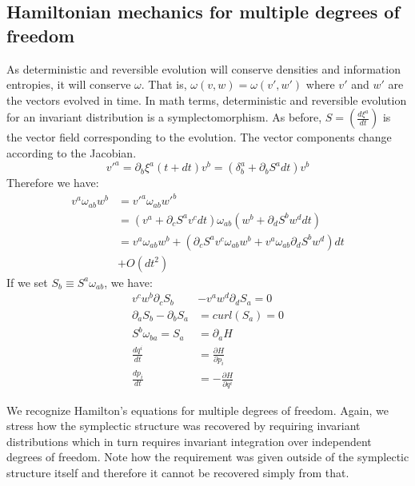 \documentclass[11pt]{elsarticle}
\begin{document}
\subsection*{Hamiltonian mechanics for multiple degrees of freedom}

As deterministic and reversible evolution will conserve densities and information entropies, it will conserve $\omega$. That is, $\omega(v, w) = \omega(v',w')$ where $v'$ and $w'$ are the vectors evolved in time. In math terms, deterministic and reversible evolution for an invariant distribution is a symplectomorphism. As before, $S = \left(\frac{d\xi^a}{dt}\right)$ is the vector field corresponding to the evolution. The vector components change according to the Jacobian.
\begin{equation}
	v'^a = \partial_b \xi^a(t+dt) v^b = (\delta^a_b + \partial_b S^a dt) v^b
\end{equation}
Therefore we have:
\begin{align*}
v^{a} \omega_{ab} w^{b} &= v'^{a} \omega_{ab} w'^{b}  \\
&= (v^{a} + \partial_{c} S^{a} v^{c} dt) \omega_{ab} ( w^{b} + \partial_{d} S^{b} w^{d} dt) \\
&= v^{a} \omega_{ab} w^{b} + (\partial_{c} S^{a} v^{c} \omega_{ab} w^{b} + v^{a} \omega_{ab} \partial_{d} S^{b} w^{d}) dt \\ &+ O(dt^2)
\end{align*}
If we set $S_{b} \equiv S^{a} \omega_{ab}$, we have:
\begin{equation}
\begin{aligned}
v^{c} w^{b} \partial_{c} S_{b} &- v^{a} w^{d} \partial_{d} S_{a} = 0\\
\partial_{a} S_{b} - \partial_{b} S_{a} &= curl(S_{a}) = 0 \\
S^{b} \omega_{ba} = S_{a} &= \partial_{a}H \\
\frac{dq^i}{dt} &= \frac{\partial H}{\partial p_i}  \\
\frac{dp_i}{dt} &= - \frac{\partial H}{\partial q^i}
\end{aligned}
\end{equation}

We recognize Hamilton's equations for multiple degrees of freedom. Again, we stress how the symplectic structure was recovered by requiring invariant distributions which in turn requires invariant integration over independent degrees of freedom. Note how the requirement was given outside of the symplectic structure itself and therefore it cannot be recovered simply from that.
\end{document}
